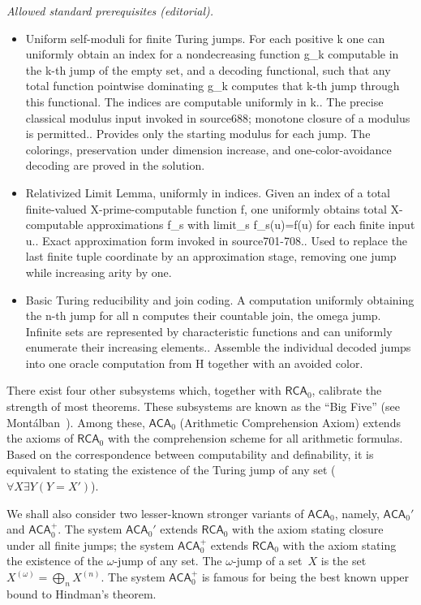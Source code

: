 \documentclass[10pt,a4paper]{article}
\newcommand{\RCA}[0]{\mathsf{RCA}}
\newcommand{\ACA}[0]{\mathsf{ACA}}
\def\qt#1{``#1''}%
\numberwithin{theorem}{section}
\begin{document}
\noindent\textit{Allowed standard prerequisites (editorial).}\begin{itemize}
\item Uniform self-moduli for finite Turing jumps. For each positive k one can uniformly obtain an index for a nondecreasing function g\_k computable in the k-th jump of the empty set, and a decoding functional, such that any total function pointwise dominating g\_k computes that k-th jump through this functional. The indices are computable uniformly in k.. The precise classical modulus input invoked in source688; monotone closure of a modulus is permitted.. Provides only the starting modulus for each jump. The colorings, preservation under dimension increase, and one-color-avoidance decoding are proved in the solution.
\item Relativized Limit Lemma, uniformly in indices. Given an index of a total finite-valued X-prime-computable function f, one uniformly obtains total X-computable approximations f\_s with limit\_s f\_s(u)=f(u) for each finite input u.. Exact approximation form invoked in source701-708.. Used to replace the last finite tuple coordinate by an approximation stage, removing one jump while increasing arity by one.
\item Basic Turing reducibility and join coding. A computation uniformly obtaining the n-th jump for all n computes their countable join, the omega jump. Infinite sets are represented by characteristic functions and can uniformly enumerate their increasing elements.. Assemble the individual decoded jumps into one oracle computation from H together with an avoided color.
\end{itemize}\medskip
There exist four other subsystems which, together with $\RCA_0$, calibrate the strength of most theorems. These subsystems are known as the \qt{Big Five} (see Mont\'alban~\cite{montalban_open_2011}). Among these, $\ACA_0$ (Arithmetic Comprehension Axiom) extends the axioms of $\RCA_0$ with the comprehension scheme for all arithmetic formulas. Based on the correspondence between computability and definability, it is equivalent to stating the existence of the Turing jump of any set ($\forall X \exists Y (Y = X')$).

We shall also consider two lesser-known stronger variants of $\ACA_0$, namely, $\ACA_0'$ and $\ACA_0^+$. The system $\ACA_0'$ extends $\RCA_0$ with the axiom stating closure under all finite jumps; the system $\ACA_0^+$ extends $\RCA_0$ with the axiom stating the existence of the $\omega$-jump of any set. The $\omega$-jump of a set~$X$ is the set $X^{(\omega)} = \bigoplus_n X^{(n)}$. The system $\ACA_0^+$ is famous for being the best known upper bound to Hindman's theorem.%
\end{document}
